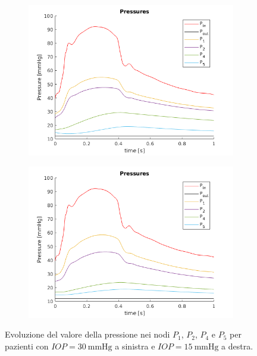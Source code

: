 \documentclass{article}
\begin{document}
\begin{figure}[h]
\begin{subfigure}{.5\textwidth}
  \centering
  \includegraphics[width=1.0\linewidth]{Pictures/IOP30_part1/pressures_30.png}
\end{subfigure}
\begin{subfigure}{.5\textwidth}
  \centering
  \includegraphics[width=1.0\linewidth]{Pictures/IOP15_part1/pressures_15.png}
\end{subfigure}
\caption{Evoluzione del valore della pressione nei nodi  $P_1$, $P_2$, $P_4$ e $P_5$ per pazienti con $IOP = \SI{30}{\mmHg}$ a sinistra e $IOP = \SI{15}{\mmHg}$ a destra.}
\label{pressioni1530}
\end{figure}
\end{document}
